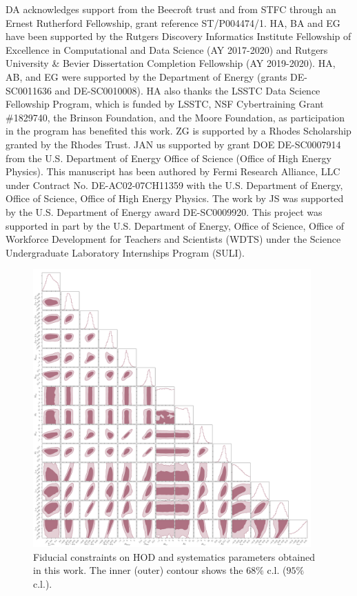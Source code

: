 \documentclass[a4paper,11pt]{article}
\begin{document}
DA acknowledges support from the Beecroft trust and from STFC through
an Ernest Rutherford Fellowship, grant reference ST/P004474/1.  HA, BA
and EG have been supported by the Rutgers Discovery Informatics
Institute Fellowship of Excellence in Computational and Data Science
(AY 2017-2020) and Rutgers University \& Bevier Dissertation
Completion Fellowship (AY 2019-2020). HA, AB, and EG were supported by
the Department of Energy (grants DE-SC0011636 and DE-SC0010008). HA
also thanks the LSSTC Data Science Fellowship Program, which is funded
by LSSTC, NSF Cybertraining Grant \#1829740, the Brinson Foundation,
and the Moore Foundation, as participation in the program has
benefited this work. ZG is supported by a Rhodes Scholarship granted
by the Rhodes Trust. JAN us supported by grant DOE DE-SC0007914 from
the U.S. Department of Energy Office of Science (Office of High Energy
Physics). This manuscript has been authored by Fermi Research
Alliance, LLC under Contract No. DE-AC02-07CH11359 with the
U.S. Department of Energy, Office of Science, Office of High Energy
Physics. The work by JS was supported by the U.S. Department of Energy
award DE-SC0009920. This project was supported in part by the
U.S. Department of Energy, Office of Science, Office of Workforce
Development for Teachers and Scientists (WDTS) under the Science
Undergraduate Laboratory Internships Program (SULI).

\appendix

\begin{figure}
\begin{center}
\includegraphics[width=0.95\textwidth]{figures/contours_mPk=HOD_fix=alpha-fc-sigmaM_HOD=zevol_fit=pz-shifts+prior=0p2-pz-widths+prior=0p2_fit=auto+cross_cosmo=const_cov=G+NG+SSC-LINBIAS_HOD-param=zfid_clfit=HOD-zevol.pdf}
\caption{Fiducial constraints on HOD and systematics parameters obtained in this work. The inner (outer) contour shows the $68 \%$ c.l. ($95 \%$ c.l.).}
\label{fig:constraints-fid-full}
\end{center}
\end{figure}
\end{document}
